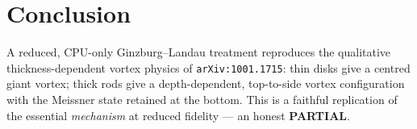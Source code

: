 \documentclass[11pt]{article}
\begin{document}
\section{Conclusion}
A reduced, CPU-only Ginzburg--Landau treatment reproduces the qualitative
thickness-dependent vortex physics of \texttt{arXiv:1001.1715}: thin disks give a
centred giant vortex; thick rods give a depth-dependent, top-to-side vortex
configuration with the Meissner state retained at the bottom. This is a faithful
replication of the essential \emph{mechanism} at reduced fidelity --- an honest
\textbf{PARTIAL}.
\end{document}
